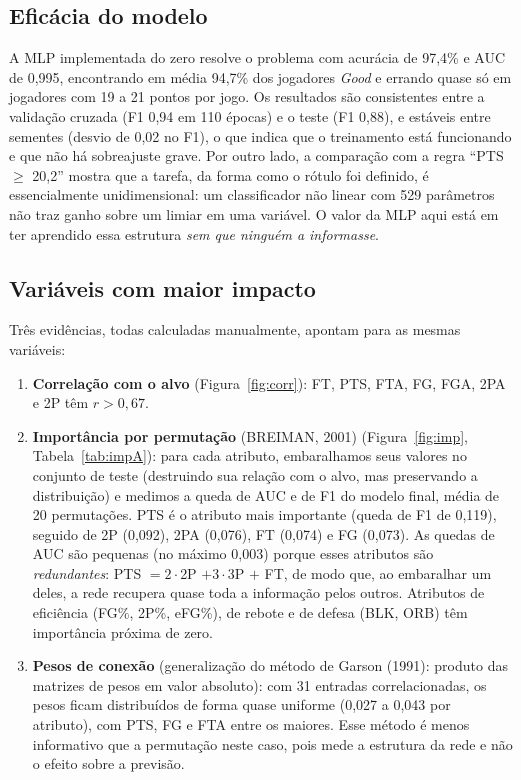 \documentclass[11pt,a4paper]{article}
\begin{document}
\subsection{Eficácia do modelo}
A MLP implementada do zero resolve o problema com acurácia de 97,4\% e AUC de 0,995, encontrando em média
94,7\% dos jogadores \emph{Good} e errando quase só em jogadores com 19 a 21 pontos por jogo. Os resultados
são consistentes entre a validação cruzada (F1 0,94 em 110 épocas) e o teste (F1 0,88), e estáveis entre
sementes (desvio de 0,02 no F1), o que indica que o treinamento está funcionando e que não há sobreajuste
grave. Por outro lado, a comparação com a regra ``PTS $\ge$ 20,2'' mostra que a tarefa, da forma como o rótulo
foi definido, é essencialmente unidimensional: um classificador não linear com 529 parâmetros não traz
ganho sobre um limiar em uma variável. O valor da MLP aqui está em ter aprendido essa estrutura
\emph{sem que ninguém a informasse}.

\subsection{Variáveis com maior impacto}\label{sec:importancia}
Três evidências, todas calculadas manualmente, apontam para as mesmas variáveis:

\begin{enumerate}
  \item \textbf{Correlação com o alvo} (Figura~\ref{fig:corr}): FT, PTS, FTA, FG, FGA, 2PA e 2P têm $r > 0{,}67$.
  \item \textbf{Importância por permutação} (BREIMAN, 2001) (Figura~\ref{fig:imp}, Tabela~\ref{tab:impA}): para cada atributo,
        embaralhamos seus valores no conjunto de teste (destruindo sua relação com o alvo, mas preservando a
        distribuição) e medimos a queda de AUC e de F1 do modelo final, média de 20 permutações. PTS é o
        atributo mais importante (queda de F1 de 0,119), seguido de 2P (0,092), 2PA (0,076), FT (0,074) e FG
        (0,073). As quedas de AUC são pequenas (no máximo 0,003) porque esses atributos são
        \emph{redundantes}: PTS $= 2\cdot$2P $+ 3\cdot$3P $+$ FT, de modo que, ao embaralhar um deles, a rede
        recupera quase toda a informação pelos outros. Atributos de eficiência (FG\%, 2P\%, eFG\%), de rebote e
        de defesa (BLK, ORB) têm importância próxima de zero.
  \item \textbf{Pesos de conexão} (generalização do método de Garson (1991): produto das matrizes de pesos em valor
        absoluto): com 31 entradas correlacionadas, os pesos ficam distribuídos de forma quase uniforme
        (0,027 a 0,043 por atributo), com PTS, FG e FTA entre os maiores. Esse método é menos informativo que a
        permutação neste caso, pois mede a estrutura da rede e não o efeito sobre a previsão.
\end{enumerate}
\end{document}
